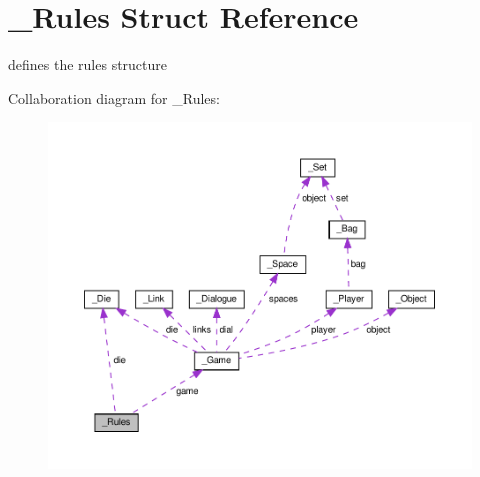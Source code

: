 \hypertarget{struct__Rules}{}\section{\+\_\+\+Rules Struct Reference}
\label{struct__Rules}


defines the rules structure  




Collaboration diagram for \+\_\+\+Rules\+:
\nopagebreak
\begin{figure}[H]
\begin{center}
\leavevmode
\includegraphics[width=350pt]{struct__Rules__coll__graph}
\end{center}
\end{figure}
